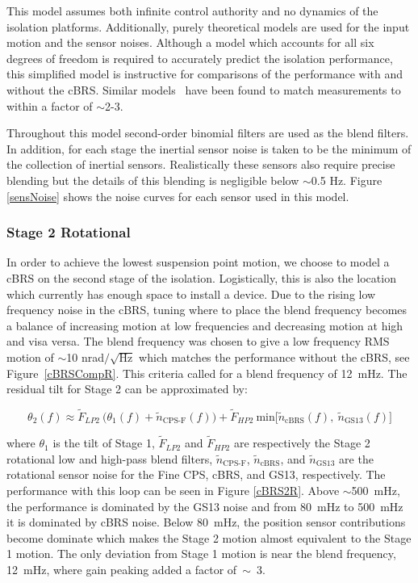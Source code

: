 \documentclass [12pt, proquest]{uwthesis}[2019]
\begin{document}
This model assumes both infinite control authority and no dynamics of the isolation platforms. Additionally, purely theoretical models are used for the input motion and the sensor noises. Although a model which accounts for all six degrees of freedom is required to accurately predict the isolation performance, this simplified model is instructive for comparisons of the performance with and without the cBRS. Similar models~\cite{windproofing} have been found to match measurements to within a factor of $\sim$2-3.

Throughout this model second-order binomial filters are used as the blend filters. In addition, for each stage the inertial sensor noise is taken to be the minimum of the collection of inertial sensors. Realistically these sensors also require precise blending but the details of this blending is negligible below $\sim$0.5 Hz. Figure \ref{sensNoise} shows the noise curves for each sensor used in this model.


\subsubsection{Stage 2 Rotational}


In order to achieve the lowest suspension point motion, we choose to model a cBRS on the second stage of the isolation. Logistically, this is also the location which currently has enough space to install a device. Due to the rising low frequency noise in the cBRS, tuning where to place the blend frequency becomes a balance of increasing motion at low frequencies and decreasing motion at high and visa versa. The blend frequency was chosen to give a low frequency RMS motion of $\sim$10 nrad$/\sqrt{\text{Hz}}$ which matches the performance without the cBRS, see Figure~\ref{cBRSCompR}. This criteria called for a blend frequency of 12~mHz. The residual tilt for Stage 2 can be approximated by:

\begin{equation}
\theta_2(f)\approx \tilde{F}_{LP2}\ \big(\theta_1(f)+\tilde{n}_\text{CPS-F}(f)\big)+\tilde{F}_{HP2}\ \text{min}\big[\tilde{n}_\text{cBRS}(f),\ \tilde{n}_\text{GS13}(f)\big]
\end{equation}

where $\theta_1$ is the tilt of Stage 1, $\tilde{F}_{LP2}$ and $\tilde{F}_{HP2}$ are respectively the Stage 2 rotational low and high-pass blend filters, $\tilde{n}_\text{CPS-F}$, $\tilde{n}_\text{cBRS}$, and $\tilde{n}_\text{GS13}$ are the rotational sensor noise for the Fine CPS, cBRS, and GS13, respectively. The performance with this loop can be seen in Figure \ref{cBRS2R}. Above $\sim$500~mHz, the performance is dominated by the GS13 noise and from 80~mHz to 500~mHz it is dominated by cBRS noise. Below 80~mHz, the position sensor contributions become dominate which makes the Stage 2 motion almost equivalent to the Stage 1 motion. The only deviation from Stage 1 motion is near the blend frequency, 12~mHz, where gain peaking added a factor of~$\sim$~3. 
\end{document}
